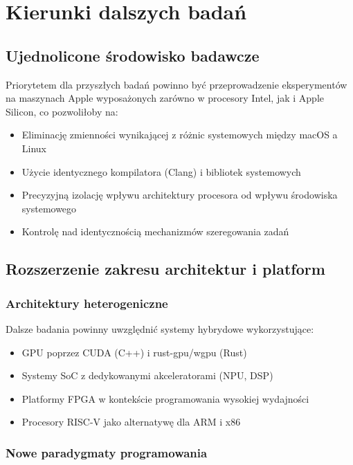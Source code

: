 \section{Kierunki dalszych badań}

\subsection{Ujednolicone środowisko badawcze}

Priorytetem dla przyszłych badań powinno być przeprowadzenie eksperymentów na maszynach Apple wyposażonych zarówno w procesory Intel, jak i Apple Silicon, co pozwoliłoby na:
\begin{itemize}
    \item Eliminację zmienności wynikającej z różnic systemowych między macOS a Linux
    \item Użycie identycznego kompilatora (Clang) i bibliotek systemowych
    \item Precyzyjną izolację wpływu architektury procesora od wpływu środowiska systemowego
    \item Kontrolę nad identycznością mechanizmów szeregowania zadań
\end{itemize}

\subsection{Rozszerzenie zakresu architektur i platform}

\subsubsection{Architektury heterogeniczne}

Dalsze badania powinny uwzględnić systemy hybrydowe wykorzystujące:
\begin{itemize}
    \item GPU poprzez CUDA (C++) i rust-gpu/wgpu (Rust)
    \item Systemy SoC z dedykowanymi akceleratorami (NPU, DSP)
    \item Platformy FPGA w kontekście programowania wysokiej wydajności
    \item Procesory RISC-V jako alternatywę dla ARM i x86
\end{itemize}

\subsubsection{Nowe paradygmaty programowania}

